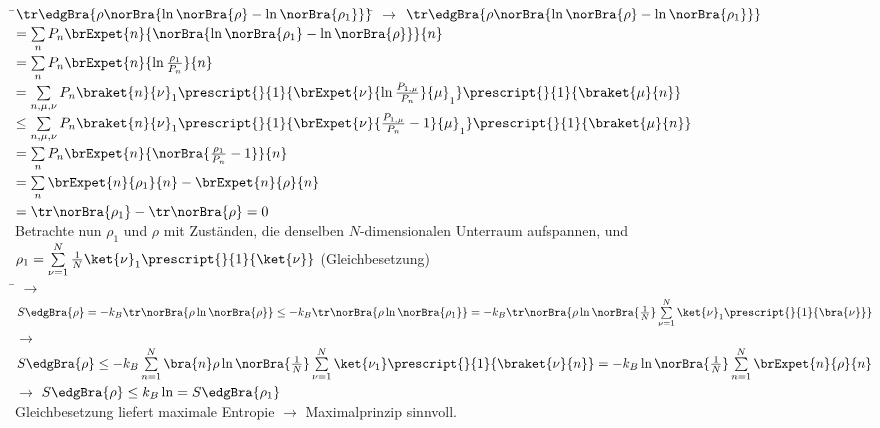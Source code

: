 \begin{tabbing}
\hspace{4em} \=$\tr\edgBra{\rho\norBra{\ln\norBra{\rho}-\ln\norBra{\rho_1}}}$\= \kill
$\rightarrow$\> $\tr\edgBra{\rho\norBra{\ln\norBra{\rho}-\ln\norBra{\rho_1}}}$\>$=\sum\limits_n P_n \brExpet{n}{\norBra{\ln\norBra{\rho_1}-\ln\norBra{\rho}}}{n}$\\
\>\>$=\sum\limits_n P_n \brExpet{n}{\ln \frac{\rho_1}{P_n}}{n}$\\
\>\>$=\sum\limits_{n,\mu,\nu}P_n \braket{n}{\nu}_1 \prescript{}{1}{\brExpet{\nu}{\ln\frac{P_{1,\mu}}{P_n}}{\mu}_1}\prescript{}{1}{\braket{\mu}{n}}$\\
\>\>$\leq\sum\limits_{n,\mu,\nu}P_n \braket{n}{\nu}_1 \prescript{}{1}{\brExpet{\nu}{\frac{P_{1,\mu}}{P_n}-1}{\mu}_1} \prescript{}{1}{\braket{\mu}{n}}$\\
\>\>$=\sum\limits_n P_n \brExpet{n}{\norBra{\frac{\rho_1}{P_n}-1}}{n}$\\
\>\>$=\sum\limits_n \brExpet{n}{\rho_1}{n} - \brExpet{n}{\rho}{n}$\\
\>\>$=\tr\norBra{\rho_1} - \tr\norBra{\rho} = 0$\\
Betrachte nun $\rho_1$ und $\rho$ mit Zuständen, die denselben $N$-dimensionalen Unterraum aufspannen, und\\ $\rho_1 = \sum\limits_{\nu=1}^N \frac{1}{N} \ket{\nu}_1\prescript{}{1}{\ket{\nu}}$ (Gleichbesetzung)\\
\hspace{4em} \= \kill
$\rightarrow$\> $S\edgBra{\rho} = -k_B \tr \norBra{\rho\ln\norBra{\rho}} \leq -k_B \tr\norBra{\rho\ln\norBra{\rho_1}} = - k_B \tr\norBra{\rho\ln\norBra{\frac{1}{N}}\sum\limits_{\nu=1}^N \ket{\nu}_1\prescript{}{1}{\bra{\nu}}}$\\
$\rightarrow$\> $S\edgBra{\rho} \leq - k_B \sum\limits_{n=1}^N \bra{n}\rho\ln\norBra{\frac{1}{N}}\sum\limits_{\nu =1}^N\ket{\nu_1}\prescript{}{1}{\braket{\nu}{n}} = - k_B \ln\norBra{\frac{1}{N}}\sum\limits_{n=1}^N\brExpet{n}{\rho}{n}$\\
$\rightarrow$\> $S\edgBra{\rho} \leq k_B \ln  = S\edgBra{\rho_1}$\\
Gleichbesetzung liefert maximale Entropie $\rightarrow$ Maximalprinzip sinnvoll.
\end{tabbing}


